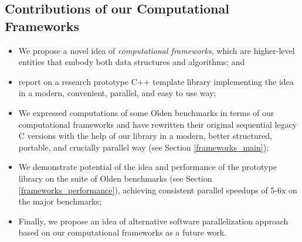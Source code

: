 \subsection{Contributions of our Computational Frameworks}
\begin{itemize}[style=unboxed,leftmargin=0cm]
\itemsep0em
\renewcommand\labelitemi{$\vartriangleright$}
\renewcommand\labelitemii{$\bullet$}
\item We propose a novel idea of \textit{computational frameworks}, which are higher-level entities that embody both data structures and algorithms; and
\item report on a research prototype C++ template library \cite{frameworks-repo} implementing the idea in a modern, convenient, parallel, and easy to use way;
\item We expressed computations of some Olden benchmarks in terms of our computational frameworks and have rewritten their original sequential legacy C versions with the help of our library in a modern, better structured, portable, and crucially parallel way (see Section \ref{frameworks_main});
\item We demonstrate potential of the idea and performance of the prototype library on the suite of Olden benchmarks (see Section \ref{frameworks_performance}), achieving consistent parallel speedups of 5-6x on the major benchmarks;
\item Finally, we propose an idea of alternative software parallelization approach based on our computational frameworks as a future work.
\end{itemize}

%